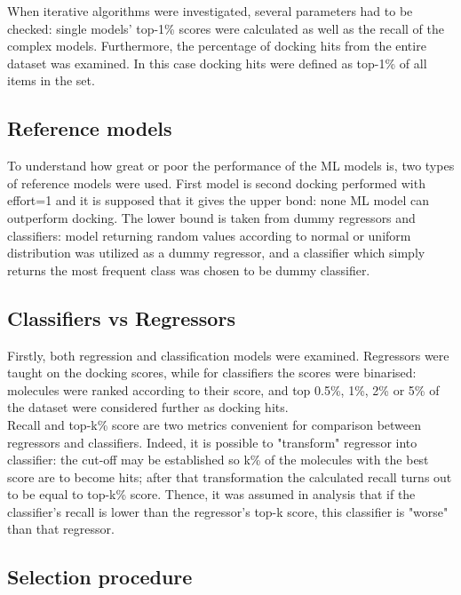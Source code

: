 When iterative algorithms were investigated, several parameters had to be checked: single models' top-1\% scores were calculated as well as the recall of the complex models.
Furthermore, the percentage of docking hits from the entire dataset was examined.
In this case docking hits were defined as top-1\% of all items in the set.\\

\subsection{Reference models}
To understand how great or poor the performance of the ML models is, two types of reference models were used.
First model is second docking performed with effort=1 and it is supposed that it gives the upper bond: none ML model can outperform docking.
The lower bound is taken from dummy regressors and classifiers: model returning random values according to normal or uniform distribution was utilized as a dummy regressor, and a classifier which simply returns the most frequent class was chosen to be dummy classifier.\\

\subsection{Classifiers vs Regressors}

Firstly, both regression and classification models were examined.
Regressors were taught on the docking scores, while for classifiers the scores were binarised: molecules were ranked according to their score, and top 0.5\%, 1\%, 2\% or 5\% of the dataset were considered further as docking hits.\\

Recall and top-k\% score are two metrics convenient for comparison between regressors and classifiers.
Indeed, it is possible to "transform" regressor into classifier: the cut-off may be established so k\% of the molecules with the best score are to become hits; after that transformation the calculated recall turns out to be equal to top-k\% score.
Thence, it was assumed in analysis that if the classifier's recall is lower than the regressor's top-k score, this classifier is "worse" than that regressor.\\

\subsection{Selection procedure}

